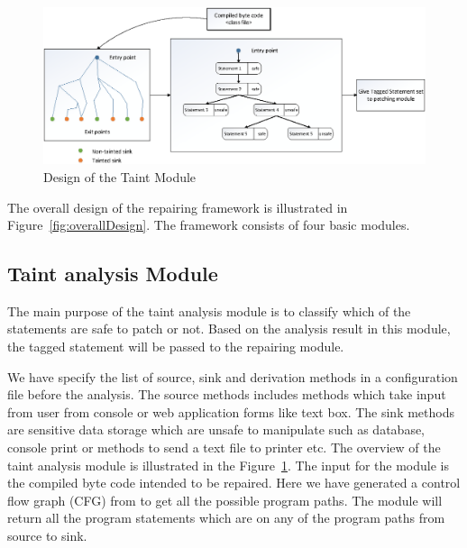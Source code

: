 % 

\begin{figure}[t]
\centering
  \includegraphics[scale= .4]{images/TaintModule.png}
  \caption{Design of the Taint Module}
  \label{fig:TaintModule}
\end{figure}


The overall design of the repairing framework is illustrated in
Figure~\ref{fig:overallDesign}. The framework consists of four basic modules.


\subsection{Taint analysis Module}
\label{subsec:TaintModule}

The main purpose of the taint analysis module is to classify which of the
statements are safe to patch or not. Based on the analysis result in this
module, the tagged statement will be passed to the repairing module.


We have specify the list of source, sink and derivation methods in a
configuration file before the analysis. The source methods includes methods
which
take input from user from console or web application forms like text box. The
sink methods are sensitive data storage which are unsafe to manipulate such as
database, console print or methods to send a text file to printer etc. The
overview of the taint analysis module is illustrated in the
Figure~\ref{fig:TaintModule}.  The input for the module is the compiled byte
code intended to be repaired. Here we have generated a control flow graph (CFG)
from to get all the possible program paths. The module will return all the
program statements which are on any of the program paths from source to sink.


